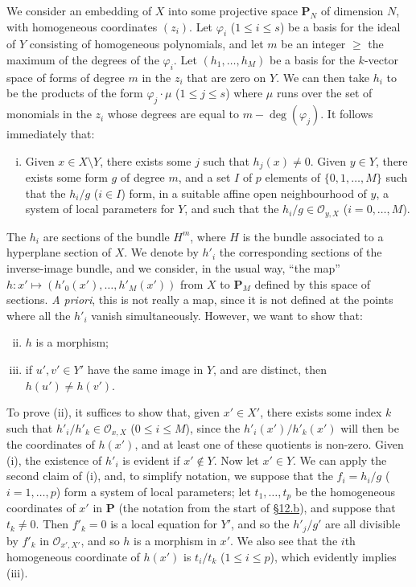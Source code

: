 \documentclass{article}
\newcommand{\scr}[1]{{\mathscr{#1}}}
\newcommand{\PP}{\mathbf{P}}
\renewcommand{\geq}{\geqslant}
\renewcommand{\leq}{\leqslant}
\newcommand{\oldpage}[1]{\marginpar{\footnotesize$\Big\vert$ \textit{p.~#1}}}
\begin{document}
We consider an embedding of $X$ into some projective space $\PP_N$ of dimension $N$, with homogeneous coordinates $(z_i)$.
Let $\varphi_i$ ($1\leq i\leq s$) be a basis for the ideal of $Y$ consisting of homogeneous polynomials, and let $m$ be an integer $\geq$ the maximum of the degrees of the $\varphi_i$.
Let $(h_1,\ldots,h_M)$ be a basis for the $k$-vector space of forms of degree $m$ in the $z_i$ that are zero on $Y$.
We can then take $h_i$ to be the products of the form $\varphi_j\cdot\mu$ ($1\leq j\leq s$) where $\mu$ runs over the set of monomials in the $z_i$ whose degrees are equal to $m-\deg(\varphi_j)$.
It follows immediately that:
\begin{enumerate}[(i)]
  \item Given $x\in X\setminus Y$, there exists some $j$ such that $h_j(x)\neq0$.
    Given $y\in Y$, there exists some form $g$ of degree $m$, and a set $I$ of $p$ elements of $\{0,1,\ldots,M\}$ such that the $h_i/g$ ($i\in I$) form, in a suitable affine open neighbourhood of $y$, a system of local parameters for $Y$, and such that the $h_i/g\in\scr{O}_{y,X}$ ($i=0,\ldots,M$).
\end{enumerate}

The $h_i$ are  sections of the bundle $H^m$, where $H$ is the bundle associated to a hyperplane section of $X$.
We denote by $h'_i$ the corresponding sections of the inverse-image bundle, and we consider, in the usual way, ``the map'' $h\colon x'\mapsto(h'_0(x'),\ldots,h'_M(x'))$ from $X$ to $\PP_M$ defined by this space of sections.
\emph{A priori}, this is not really a map, since it is not defined at the points where all the $h'_i$ vanish simultaneously.
However, we want to show that:

\begin{enumerate}[(i)]
  \setcounter{enumi}{1}
  \item $h$ is a morphism;
  \item if $u',v'\in Y'$ have the same image in $Y$, and are distinct, then $h(u')\neq h(v')$.
\end{enumerate}

To prove (ii), it suffices to show that, given $x'\in X'$, there exists some index $k$ such that $h'_i/h'_k\in\scr{O}_{x,X}$ ($0\leq i\leq M$), since the $h'_i(x')/h'_k(x')$ will then be the coordinates of $h(x')$, and at least one of these quotients is non-zero.
Given (i), the existence of $h'_i$ is evident if $x'\not\in Y$.
Now let $x'\in Y$.
We can apply the second claim of (i), and, to simplify notation,
\oldpage{128}
we suppose that the $f_i=h_i/g$ ($i=1,\ldots,p$) form a system of local parameters;
let $t_1,\ldots,t_p$ be the homogeneous coordinates of $x'$ in $\PP$ (the notation from the start of \hyperref[subsection12b]{\S12.b}), and suppose that $t_k\neq0$.
Then $f'_k=0$ is a local equation for $Y'$, and so the $h'_j/g'$ are all divisible by $f'_k$ in $\scr{O}_{x',X'}$, and so $h$ is a morphism in $x'$.
We also see that the $i$th homogeneous coordinate of $h(x')$ is $t_i/t_k$ ($1\leq i\leq p$), which evidently implies (iii).
\end{document}
